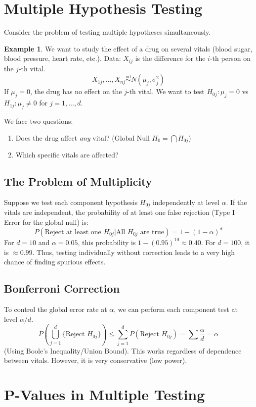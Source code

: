\documentclass[12pt, a4paper]{article}
\theoremstyle{definition}
\newtheorem{example}{Example}
\newcommand{\iid}{\overset{\text{iid}}{\sim}}
\begin{document}
\section{Multiple Hypothesis Testing}

Consider the problem of testing multiple hypotheses simultaneously.
\begin{example}
We want to study the effect of a drug on several vitals (blood sugar, blood pressure, heart rate, etc.).
Data: $X_{ij}$ is the difference for the $i$-th person on the $j$-th vital.
$$ X_{1j}, \dots, X_{nj} \iid N(\mu_j, \sigma_j^2) $$
If $\mu_j = 0$, the drug has no effect on the $j$-th vital.
We want to test $H_{0j}: \mu_j = 0$ vs $H_{1j}: \mu_j \neq 0$ for $j=1, \dots, d$.
\end{example}

We face two questions:
\begin{enumerate}
    \item Does the drug affect \textit{any} vital? (Global Null $H_0 = \bigcap H_{0j}$)
    \item Which specific vitals are affected?
\end{enumerate}

\subsection{The Problem of Multiplicity}
Suppose we test each component hypothesis $H_{0j}$ independently at level $\alpha$.
If the vitals are independent, the probability of at least one false rejection (Type I Error for the global null) is:
$$ P(\text{Reject at least one } H_{0j} | \text{All } H_{0j} \text{ are true}) = 1 - (1-\alpha)^d $$
For $d=10$ and $\alpha=0.05$, this probability is $1 - (0.95)^{10} \approx 0.40$.
For $d=100$, it is $\approx 0.99$.
Thus, testing individually without correction leads to a very high chance of finding spurious effects.

\subsection{Bonferroni Correction}
To control the global error rate at $\alpha$, we can perform each component test at level $\alpha/d$.
$$ P(\bigcup_{j=1}^d \{ \text{Reject } H_{0j} \}) \le \sum_{j=1}^d P(\text{Reject } H_{0j}) = \sum \frac{\alpha}{d} = \alpha $$
(Using Boole's Inequality/Union Bound).
This works regardless of dependence between vitals. However, it is very conservative (low power).

\section{P-Values in Multiple Testing}
\end{document}
